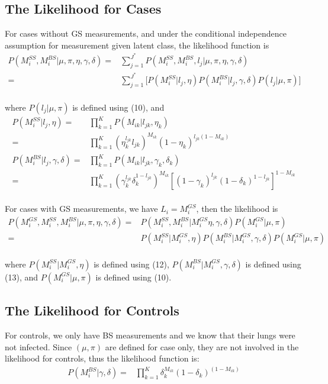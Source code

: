 \documentclass[11 pt, a4paper]{article}  %
\begin{document}
\subsection{The Likelihood for Cases}
For cases without GS measurements, and under the conditional independence assumption for measurement given latent class, the likelihood function is
\begin{align*}
 P(M_i^{SS},M_i^{BS} | \mu, \pi, \eta, \gamma, \delta) 
 = & \sum_{j = 1}^{J^*}  P(M_i^{SS},M_i^{BS}, l_j | \mu, \pi, \eta, \gamma, \delta)  \\ 
= & \sum_{j = 1}^{J^*} \big[ P(M_i^{SS} | l_j, \eta) P(M_i^{BS} | l_j, \gamma, \delta) P(l_j | \mu, \pi) \big ] 
\end{align*}
\\
where $P(l_j | \mu, \pi)$ is defined using (10), and
\begin{align}
P(M_i^{SS} | l_j, \eta) = & \prod_{k=1}^K P(M_{ik} | l_{jk}, \eta_k) \nonumber \\
 = & \prod_{k=1}^K (\eta_k^{l_{jk}}l_{jk})^{M_{ik}} (1-\eta_k)^{l_{jk}(1-M_{ik})}\\
P(M_i^{BS} | l_j, \gamma, \delta) = & \prod_{k=1}^K P(M_{ik} | l_{jk}, \gamma_k, \delta_k) \nonumber \\
 = & \prod_{k=1}^K (\gamma_k^{l_{jk}} \delta_k^{1-l_{jk}})^{M_{ik}} [(1-\gamma_k)^{l_{jk}} (1-\delta_k)^{1-l_{jk}}]^{1-M_{ik}}
\end{align}
\\
For cases with GS measurements, we have $L_i = M_i^{GS}$, then the likelihood is 
\begin{align*}
 P(M_i^{GS},M_i^{SS},M_i^{BS} | \mu, \pi, \eta, \gamma, \delta) 
= & P(M_i^{SS},M_i^{BS} | M_i^{GS} \eta, \gamma, \delta) P(M_i^{GS} | \mu, \pi)\\
= & P(M_i^{SS}| M_i^{GS}, \eta) P(M_i^{BS} | M_i^{GS}, \gamma, \delta) P(M_i^{GS} | \mu, \pi)
\end{align*}
\\
where $P(M_i^{SS}| M_i^{GS}, \eta)$ is defined using (12), $P(M_i^{BS} | M_i^{GS}, \gamma, \delta)$ is defined using (13), and $P(M_i^{GS} | \mu, \pi)$ is defined using (10).\\

\subsection{The Likelihood for Controls}
For controls, we only have BS measurements and we know that their lungs were not infected. Since $(\mu, \pi)$ are defined for case only, they are not involved in the likelihood for controls, thus the likelihood function is:
\begin{align*}
 P(M_i^{BS} |\gamma, \delta) = & \prod_{k=1}^K \delta_k^{M_{ik}}(1-\delta_k)^{(1-M_{ik})}
\end{align*}
\\
\end{document}
